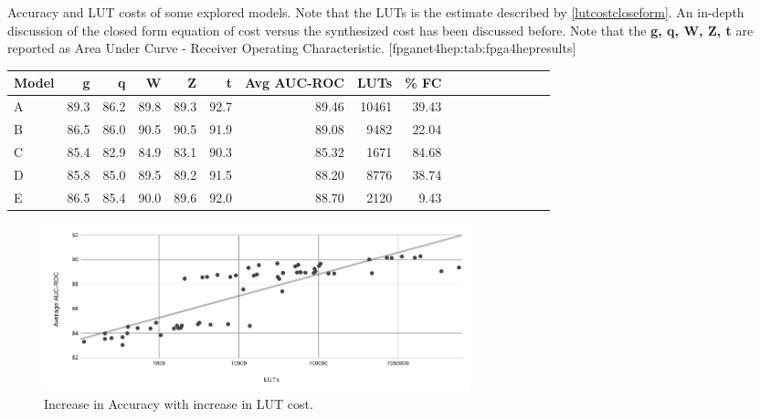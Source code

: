 \begin{table}
    \begin{sidecaption}{%
        Accuracy and LUT costs of some explored models. Note that the LUTs is the estimate described by \eqref{lutcostcloseform}. An in-depth discussion of the closed form equation of cost versus the synthesized cost has been discussed before. Note that the \textbf{g, q, W, Z, t} are reported as Area Under Curve - Receiver Operating Characteristic.
    }[fpganet4hep:tab:fpga4hepresults]
\begin{threeparttable}
\begin{tabular}{lrrrrrrrrrrrrrrrr}
\hline
Model &    g &   q  &   W  &   Z  &   t  & Avg AUC-ROC  & LUTs     & \% FC \\ \hline
A     & 89.3 & 86.2 & 89.8 & 89.3 & 92.7 & 89.46  & 10461    & 39.43 \\
B     & 86.5 & 86.0 & 90.5 & 90.5 & 91.9 & 89.08  & 9482     & 22.04 \\
C     & 85.4 & 82.9 & 84.9 & 83.1 & 90.3 & 85.32  & 1671     & 84.68 \\ 
D     & 85.8 & 85.0 & 89.5 & 89.2 & 91.5 & 88.20  & 8776     & 38.74 \\ 
E     & 86.5 & 85.4 & 90.0 & 89.6 & 92.0 & 88.70  & 2120     & 9.43  \\\hline 
    \end{tabular}
\end{threeparttable}
\end{sidecaption}
\end{table}


\begin{figure}[h]
    \centering
    \includegraphics[width=350pt]{figures/bison/LUTvAcc.png}
    \caption{Increase in Accuracy with increase in LUT cost.}
    \label{fig:lutvacc}
\end{figure}

